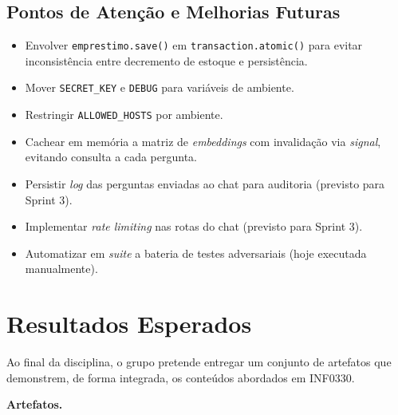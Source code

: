 \documentclass[monografia,abnt]{inf-ufg-modificado}
\newif\ifincluirstatus
\begin{document}
\section{Pontos de Atenção e Melhorias Futuras}

\begin{itemize}
    \item Envolver \texttt{emprestimo.save()} em \texttt{transaction.atomic()} para evitar inconsistência entre decremento de estoque e persistência.
    \item Mover \texttt{SECRET\_KEY} e \texttt{DEBUG} para variáveis de ambiente.
    \item Restringir \texttt{ALLOWED\_HOSTS} por ambiente.
    \item Cachear em memória a matriz de \textit{embeddings} com invalidação via \textit{signal}, evitando consulta a cada pergunta.
    \item Persistir \textit{log} das perguntas enviadas ao chat para auditoria (previsto para Sprint 3).
    \item Implementar \textit{rate limiting} nas rotas do chat (previsto para Sprint 3).
    \item Automatizar em \textit{suite} a bateria de testes adversariais (hoje executada manualmente).
\end{itemize}

\fi  %

\chapter{Resultados Esperados}

Ao final da disciplina, o grupo pretende entregar um conjunto de artefatos que demonstrem, de forma integrada, os conteúdos abordados em INF0330.

\noindent\textbf{Artefatos.}
\end{document}
